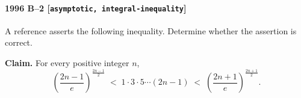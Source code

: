 \paragraph{1996 B--2 \textnormal{[\texttt{asymptotic, integral-inequality}]}}
A reference asserts the following inequality. Determine whether the
assertion is correct.

\textbf{Claim.} For every positive integer $n$,
\[
\left( \frac{2n-1}{e} \right)^{\frac{2n-1}{2}} \;<\;
1 \cdot 3 \cdot 5 \cdots (2n-1) \;<\;
\left( \frac{2n+1}{e} \right)^{\frac{2n+1}{2}}.
\]
